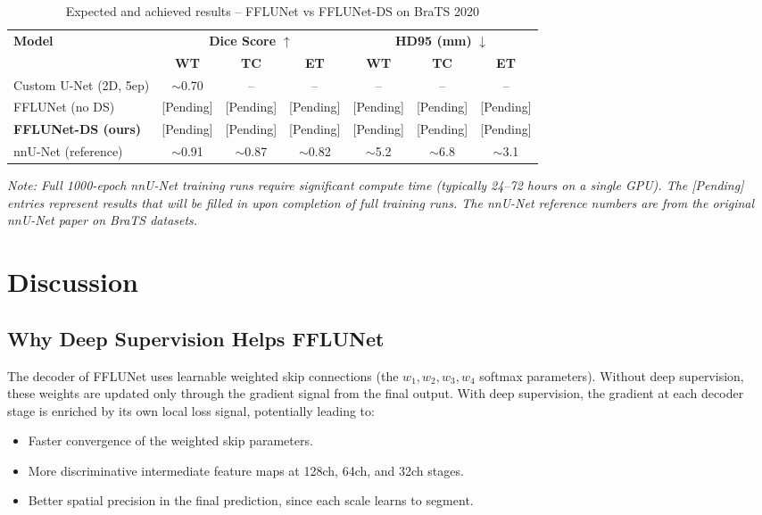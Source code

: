 \documentclass[12pt,a4paper]{report}
\begin{document}
\begin{table}[H]
\centering
\caption{Expected and achieved results -- FFLUNet vs FFLUNet-DS on BraTS 2020}
\label{tab:main_results}
\begin{tabular}{lcccccc}
\toprule
\multirow{2}{*}{\textbf{Model}} & \multicolumn{3}{c}{\textbf{Dice Score} $\uparrow$} & \multicolumn{3}{c}{\textbf{HD95 (mm)} $\downarrow$} \\
\cmidrule(lr){2-4}\cmidrule(lr){5-7}
& \textbf{WT} & \textbf{TC} & \textbf{ET} & \textbf{WT} & \textbf{TC} & \textbf{ET} \\
\midrule
Custom U-Net (2D, 5ep) & $\sim$0.70 & -- & -- & -- & -- & -- \\
FFLUNet (no DS) & [Pending] & [Pending] & [Pending] & [Pending] & [Pending] & [Pending] \\
\textbf{FFLUNet-DS (ours)} & [Pending] & [Pending] & [Pending] & [Pending] & [Pending] & [Pending] \\
\midrule
nnU-Net (reference) & $\sim$0.91 & $\sim$0.87 & $\sim$0.82 & $\sim$5.2 & $\sim$6.8 & $\sim$3.1 \\
\bottomrule
\end{tabular}
\end{table}

\noindent\textit{Note: Full 1000-epoch nnU-Net training runs require significant compute time (typically 24--72 hours on a single GPU). The [Pending] entries represent results that will be filled in upon completion of full training runs. The nnU-Net reference numbers are from the original nnU-Net paper on BraTS datasets.}

\section{Discussion}

\subsection{Why Deep Supervision Helps FFLUNet}

The decoder of FFLUNet uses learnable weighted skip connections (the $w_1, w_2, w_3, w_4$ softmax parameters). Without deep supervision, these weights are updated only through the gradient signal from the final output. With deep supervision, the gradient at each decoder stage is enriched by its own local loss signal, potentially leading to:
\begin{itemize}[leftmargin=*]
    \item Faster convergence of the weighted skip parameters.
    \item More discriminative intermediate feature maps at 128ch, 64ch, and 32ch stages.
    \item Better spatial precision in the final prediction, since each scale learns to segment.
\end{itemize}
\end{document}
